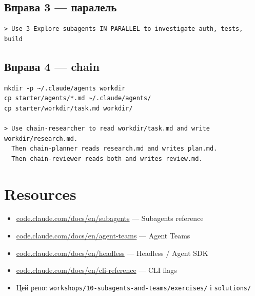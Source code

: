 \documentclass[11pt,a4paper]{article}
\begin{document}
\subsection{Вправа 3 --- паралель}

\begin{lstlisting}
> Use 3 Explore subagents IN PARALLEL to investigate auth, tests, build
\end{lstlisting}

\subsection{Вправа 4 --- chain}

\begin{lstlisting}
mkdir -p ~/.claude/agents workdir
cp starter/agents/*.md ~/.claude/agents/
cp starter/workdir/task.md workdir/

> Use chain-researcher to read workdir/task.md and write workdir/research.md.
  Then chain-planner reads research.md and writes plan.md.
  Then chain-reviewer reads both and writes review.md.
\end{lstlisting}

\section{Resources}

\begin{itemize}
\item \href{https://code.claude.com/docs/en/subagents}{code.claude.com/docs/en/subagents} --- Subagents reference
\item \href{https://code.claude.com/docs/en/agent-teams}{code.claude.com/docs/en/agent-teams} --- Agent Teams
\item \href{https://code.claude.com/docs/en/headless}{code.claude.com/docs/en/headless} --- Headless / Agent SDK
\item \href{https://code.claude.com/docs/en/cli-reference}{code.claude.com/docs/en/cli-reference} --- CLI flags
\item Цей репо: \texttt{workshops/10-subagents-and-teams/exercises/} і \texttt{solutions/}
\end{itemize}
\end{document}
